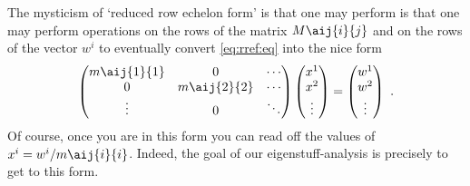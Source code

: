 The mysticism of `reduced row echelon form' is that one may perform is that one may perform operations on the rows of the matrix $M\aij{i}{j}$ and on the rows of the vector $w^i$ to eventually convert \eqref{eq:rref:eq} into the nice form
\begin{align}
    \begin{pmatrix}
        m\aij{1}{1} & 0 & \cdots \\
        0 & m\aij{2}{2} & \cdots \\
        \vdots  &0 & \ddots 
    \end{pmatrix}
    \begin{pmatrix}
        x^1 \\
        x^2 \\
        \vdots
    \end{pmatrix}
    =
    \begin{pmatrix}
        w^1 \\
        w^2 \\
        \vdots 
    \end{pmatrix} \ .
\end{align}
Of course, once you are in this form you can read off the values of $x^i = w^i/m\aij{i}{i}$. Indeed, the goal of our eigenstuff-analysis is precisely to get to this form. 

